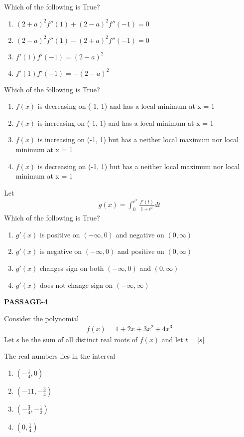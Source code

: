 \item Which of the following is True?
\begin{enumerate}
\item $(2 + a)^2 f''(1) + (2 - a)^2 f''(-1) = 0$
\item $(2 - a)^2 f''(1) - (2 + a)^2 f''(-1) = 0$
\item $f'(1)f'(-1) = (2 - a)^2$
\item $f'(1)f'(-1) = -(2 - a)^2$
\end{enumerate}

\item Which of the following is True?
\begin{enumerate}
\item $f(x)$ is decreasing on (-1, 1) and has a local minimum at x = 1
\item $f(x)$ is increasing on (-1, 1) and has a local minimum at x = 1
\item $f(x)$ is increasing on (-1, 1) but has a neither local maximum nor local minimum at x = 1
\item $f(x)$ is decreasing on (-1, 1) but has a neither local maximum nor local minimum at x = 1
\end{enumerate}

\item Let 
\begin{align*}
g(x) = \int_{0}^{e^x}\frac{f'(t)}{1 + t^2}dt
\end{align*}
Which of the following is True?
\begin{enumerate}
\item $g'(x)$ is positive on $(-\infty, 0)$ and negative on $(0, \infty)$
\item $g'(x)$ is negative on $(-\infty, 0)$ and positive on $(0, \infty)$
\item $g'(x)$ changes sign on both $(-\infty, 0)$ and $(0, \infty)$
\item $g'(x)$ does not change sign on $(-\infty, \infty)$
\end{enumerate}

\textbf{PASSAGE-4}

Consider the polynomial
\begin{align}
f(x) = 1 + 2x + 3x^2 + 4x^3
\end{align}
Let s be the sum of all distinct real roots of $f(x)$ and let $t = |s|$ 

\item The real numbers lies in the interval
\begin{enumerate}
\item $\left(-\frac{1}{4}, 0\right)$
\item $\left(-11, -\frac{3}{4}\right)$
\item $\left(-\frac{3}{4}, -\frac{1}{2}\right)$
\item $\left(0, \frac{1}{4}\right)$
\end{enumerate}

